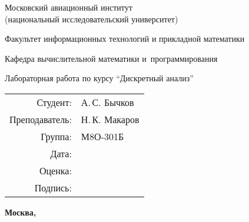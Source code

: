 \begin{titlepage}
    \begin{center}
    \bfseries
    
    {\Large Московский авиационный институт\\ (национальный исследовательский университет)
    
    }
    
    \vspace{48pt}
    
    {\large Факультет информационных технологий и прикладной математики
    }
    
    \vspace{36pt}
    
    {\large Кафедра вычислительной математики и~программирования
    
    }
    
    
    \vspace{48pt}
    
    Лабораторная работа  по курсу \enquote{Дискретный анализ}
    
    \end{center}
    
    \vspace{72pt}
    
    \begin{flushright}
    \begin{tabular}{rl}
    Студент: & А.\,С. Бычков  \\
    Преподаватель: & Н.\,К. Макаров \\
    Группа: & М8О-301Б \\
    Дата: & \\
    Оценка: & \\
    Подпись: & \\
    \end{tabular}
    \end{flushright}
    
    \vfill
    
    \begin{center}
    \bfseries
    Москва, \the\year
    \end{center}
    \end{titlepage}
    
    \pagebreak
    
